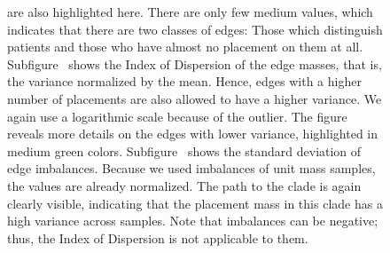 \begin{figure}[!ht]
{        are also highlighted here.
        There are only few medium values, which indicates that there are two classes of edges:
        Those which distinguish patients and those who have almost no placement on them at all.
        Subfigure~
        shows the Index of Dispersion of the edge masses, that is, the variance normalized by the mean.
        Hence, edges with a higher number of placements are also allowed to have a higher variance.
        We again use a logarithmic scale because of the outlier.
        The figure reveals more details on the edges with lower variance, highlighted in medium green colors.
        Subfigure~
        shows the standard deviation of edge imbalances.
        Because we used imbalances of unit mass samples, the values are already normalized.
        The path to the  clade is again clearly visible,
        indicating that the placement mass in this clade has a high variance across samples.
        Note that imbalances can be negative; thus, the Index of Dispersion is not applicable to them.
    }
    \label{fig:all_dispersions}
\end{figure}

%
%


